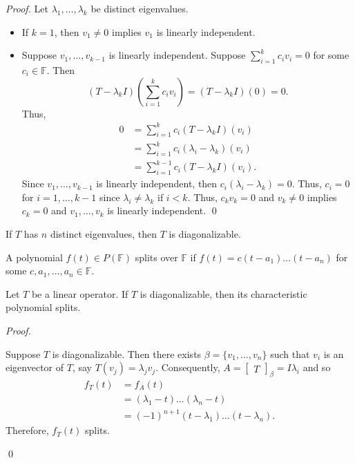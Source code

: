 \documentclass[12pt]{article}
\newenvironment{theorem}[2][Theorem]{\begin{trivlist}
\item[\hskip \labelsep {\bfseries #1}\hskip \labelsep {\bfseries #2.}]}{\end{trivlist}}
\newenvironment{corollary}[2][Corollary]{\begin{trivlist}
\item[\hskip \labelsep {\bfseries #1}\hskip \labelsep {\bfseries #2}]}{\end{trivlist}}
\newenvironment{definition}[2][Definition]{\begin{trivlist}
\item[\hskip \labelsep {\bfseries #1}\hskip \labelsep {\bfseries #2}]}{\end{trivlist}}
\newenvironment{sol}
    {\emph{Proof.}
    }
    {
    \qed
    }
\begin{document}
\textit{Proof.}
Let $\lambda_1, \dots, \lambda_k$ be distinct eigenvalues.
\begin{itemize}
    \item[Base Step:] If $k = 1$, then $v_1 \neq 0$ implies $v_1$ is linearly independent.
    
    \item[Induction Step:] Suppose $v_1, \dots, v_{k-1}$ is linearly independent. Suppose $\sum_{i = 1}^k c_iv_i = 0$ for some $c_i \in \mathbb{F}$. Then $$(T-\lambda_k I)\left( \sum_{i = 1}^kc_iv_i \right) = (T - \lambda_k I)(0) = 0.$$ Thus, \begin{align*}
        0 &= \sum_{i = 1}^k c_i(T - \lambda_k I)(v_i) \\
        &= \sum_{i = 1}^k c_i(\lambda_i - \lambda_k)(v_i) \tag{Since $T(v_i) = \lambda_iv_i$} \\
        &= \sum_{i = 1}^{k-1} c_i(T - \lambda_k I)(v_i).
    \end{align*} Since $v_1, \dots, v_{k-1}$ is linearly independent, then $c_i(\lambda_i - \lambda_k) = 0$. Thus, $c_i = 0$ for $i = 1, \dots, k-1$ since $\lambda_i \neq \lambda_k$ if $i < k$. Thus, $c_kv_k = 0$ and $v_k \neq 0$ implies $c_k = 0$ and $v_1, \dots, v_k$ is linearly independent. \qed
\end{itemize} 

\begin{corollary}{6}
If $T$ has $n$ distinct eigenvalues, then $T$ is diagonalizable.
\end{corollary}

\begin{definition}{4}
A polynomial $f(t) \in P(\mathbb{F})$ splits over $\mathbb{F}$ if $f(t) = c(t - a_1) \dots (t - a_n)$ for some $c, a_1, \dots, a_n \in \mathbb{F}$.
\end{definition}

\begin{theorem}{5.6}
Let $T$ be a linear operator. If $T$ is diagonalizable, then its characteristic polynomial splits.
\end{theorem}

\begin{sol}
Suppose $T$ is diagonalizable. Then there exists $\beta = \{ v_1, \dots, v_n \}$ such that $v_i$ is an eigenvector of $T$, say $T(v_j) = \lambda_j v_j$. Consequently, $A = \begin{bmatrix}
T
\end{bmatrix}_\beta = I\lambda_i$ and so \begin{align*}
    f_T(t) &= f_A(t) \\
    &= (\lambda_1 - t) \dots (\lambda_n - t)  \\
    &= (-1)^{n + 1}(t - \lambda_1)\dots (t - \lambda_n).
\end{align*} Therefore, $f_T(t)$ splits.
\end{sol}
\end{document}
